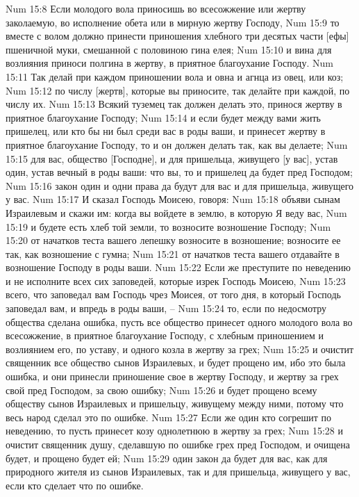 Num 15:8  Если молодого вола приносишь во всесожжение или жертву заколаемую, во исполнение обета или в мирную жертву Господу,
Num 15:9  то вместе с волом должно принести приношения хлебного три десятых части [ефы] пшеничной муки, смешанной с половиною гина елея;
Num 15:10  и вина для возлияния приноси полгина в жертву, в приятное благоухание Господу.
Num 15:11  Так делай при каждом приношении вола и овна и агнца из овец, или коз;
Num 15:12  по числу [жертв], которые вы приносите, так делайте при каждой, по числу их.
Num 15:13  Всякий туземец так должен делать это, принося жертву в приятное благоухание Господу;
Num 15:14  и если будет между вами жить пришелец, или кто бы ни был среди вас в роды ваши, и принесет жертву в приятное благоухание Господу, то и он должен делать так, как вы делаете;
Num 15:15  для вас, общество [Господне], и для пришельца, живущего [у вас], устав один, устав вечный в роды ваши: что вы, то и пришелец да будет пред Господом;
Num 15:16  закон один и одни права да будут для вас и для пришельца, живущего у вас.
Num 15:17  И сказал Господь Моисею, говоря:
Num 15:18  объяви сынам Израилевым и скажи им: когда вы войдете в землю, в которую Я веду вас,
Num 15:19  и будете есть хлеб той земли, то возносите возношение Господу;
Num 15:20  от начатков теста вашего лепешку возносите в возношение; возносите ее так, как возношение с гумна;
Num 15:21  от начатков теста вашего отдавайте в возношение Господу в роды ваши.
Num 15:22  Если же преступите по неведению и не исполните всех сих заповедей, которые изрек Господь Моисею,
Num 15:23  всего, что заповедал вам Господь чрез Моисея, от того дня, в который Господь заповедал вам, и впредь в роды ваши, --
Num 15:24  то, если по недосмотру общества сделана ошибка, пусть все общество принесет одного молодого вола во всесожжение, в приятное благоухание Господу, с хлебным приношением и возлиянием его, по уставу, и одного козла в жертву за грех;
Num 15:25  и очистит священник все общество сынов Израилевых, и будет прощено им, ибо это была ошибка, и они принесли приношение свое в жертву Господу, и жертву за грех свой пред Господом, за свою ошибку;
Num 15:26  и будет прощено всему обществу сынов Израилевых и пришельцу, живущему между ними, потому что весь народ сделал это по ошибке.
Num 15:27  Если же один кто согрешит по неведению, то пусть принесет козу однолетнюю в жертву за грех;
Num 15:28  и очистит священник душу, сделавшую по ошибке грех пред Господом, и очищена будет, и прощено будет ей;
Num 15:29  один закон да будет для вас, как для природного жителя из сынов Израилевых, так и для пришельца, живущего у вас, если кто сделает что по ошибке.
